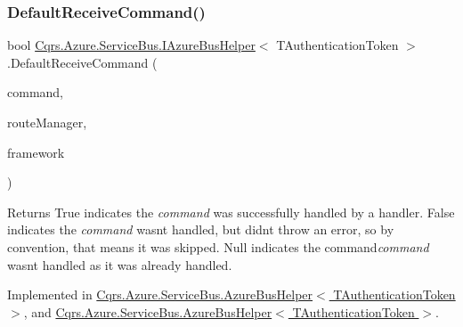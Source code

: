 \subsubsection{\texorpdfstring{Default\+Receive\+Command()}{DefaultReceiveCommand()}}
{\footnotesize\ttfamily bool \hyperlink{interfaceCqrs_1_1Azure_1_1ServiceBus_1_1IAzureBusHelper}{Cqrs.\+Azure.\+Service\+Bus.\+I\+Azure\+Bus\+Helper}$<$ T\+Authentication\+Token $>$.Default\+Receive\+Command (\begin{DoxyParamCaption}\item[{\hyperlink{interfaceCqrs_1_1Commands_1_1ICommand}{I\+Command}$<$ T\+Authentication\+Token $>$}]{command,  }\item[{\hyperlink{classCqrs_1_1Bus_1_1RouteManager}{Route\+Manager}}]{route\+Manager,  }\item[{string}]{framework }\end{DoxyParamCaption})}

\begin{DoxyReturn}{Returns}
True indicates the {\itshape command}  was successfully handled by a handler. False indicates the {\itshape command}  wasn\textquotesingle{}t handled, but didn\textquotesingle{}t throw an error, so by convention, that means it was skipped. Null indicates the command{\itshape command}  wasn\textquotesingle{}t handled as it was already handled. 
\end{DoxyReturn}


Implemented in \hyperlink{classCqrs_1_1Azure_1_1ServiceBus_1_1AzureBusHelper_ae35c260f46f8aa7ba928815187b9088e_ae35c260f46f8aa7ba928815187b9088e}{Cqrs.\+Azure.\+Service\+Bus.\+Azure\+Bus\+Helper$<$ T\+Authentication\+Token $>$}, and \hyperlink{classCqrs_1_1Azure_1_1ServiceBus_1_1AzureBusHelper_ae35c260f46f8aa7ba928815187b9088e_ae35c260f46f8aa7ba928815187b9088e}{Cqrs.\+Azure.\+Service\+Bus.\+Azure\+Bus\+Helper$<$ T\+Authentication\+Token $>$}.

\mbox{\label{interfaceCqrs_1_1Azure_1_1ServiceBus_1_1IAzureBusHelper_a29758e82b2fd6c7e3ed6b19547887db9_a29758e82b2fd6c7e3ed6b19547887db9}} 
